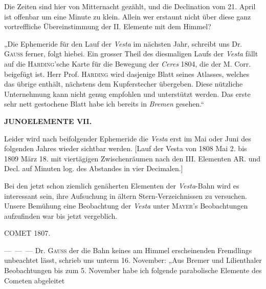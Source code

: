 \par\indent Die Zeiten sind hier von Mitternacht gezählt, und die Declination vom 21. April ist offenbar um
eine Minute zu klein. Allein wer erstaunt nicht über diese ganz vortreffliche Übereinstimmung der II.
Elemente mit dem Himmel?

\par\indent „Die Ephemeride für den Lauf der \emph{Vesta} im nächsten Jahr, schreibt uns Dr. \textsc{Gauss} ferner, folgt
hiebei. Ein grosser Theil des diesmaligen Laufs der \emph{Vesta} fällt auf die \textsc{Harding}'sche Karte für die Bewegung der \emph{Ceres} 1804, die der M. Corr. beigefügt ist. Herr Prof. \textsc{Harding} wird dasjenige Blatt seines
Atlasses, welches das übrige enthält, nächstens dem Kupferstecher übergeben. Diese nützliche Unternehmung kann nicht genug empfohlen und unterstützt werden. Das erste sehr nett gestochene Blatt
habe ich bereits in \emph{Bremen} gesehen.“

\par\clearpage
\thispagestyle{empty}
\noindent{}%
%
\parbox[t]{\dimexpr\linewidth-24mm\relax}{\centering\footnotesize\bfseries JUNO\quad ELEMENTE VII.\par}%
\makebox[12mm][r]{}\par\nobreak\medskip
\par\indent Leider wird nach beifolgender Ephemeride die \emph{Vesta} erst im Mai oder Juni des folgenden Jahres
wieder sichtbar werden. [Lauf der Vesta von 1808 Mai 2. bis 1809 März 18. mit viertägigen Zwischenräumen nach den III. Elementen AR. und Decl. auf Minuten log. des Abstandes in vier Decimalen.]

\par\indent Bei den jetzt schon ziemlich genäherten Elementen der \emph{Vesta}-Bahn wird es interessant sein, ihre
Aufsuchung in ältern Stern-Verzeichnissen zu versuchen. Unsere Bemühung eine Beobachtung der \emph{Vesta}
unter \textsc{Mayer}'s Beobachtungen aufzufinden war bis jetzt vergeblich.

\begin{flushright}
\end{flushright}

\par{}\bigskip
\begin{center}
\large COMET 1807.
\end{center}
\par\indent ---\ ---\ --- Dr. \textsc{Gauss} der die Bahn keines am Himmel erscheinenden Fremdlings unbeachtet lässt,
schrieb uns unterm 16. November: „Aus Bremer und Lilienthaler Beobachtungen bis zum 5. November
habe ich folgende parabolische Elemente des Cometen abgeleitet

